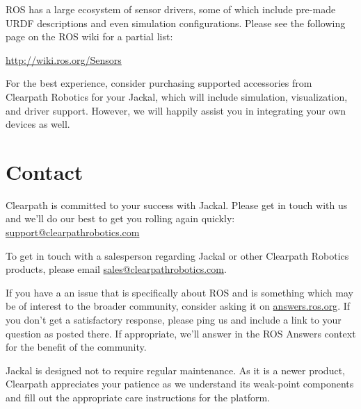 \documentclass[]{clearpath-latex/clearpath-manual}
\begin{document}
ROS has a large ecosystem of sensor drivers, some of which include pre-made URDF descriptions and
even simulation configurations. Please see the following page on the ROS wiki for a partial list:

\url{http://wiki.ros.org/Sensors}

For the best experience, consider purchasing supported accessories from Clearpath Robotics for your
Jackal, which will include simulation, visualization, and driver support. However, we will happily
assist you in integrating your own devices as well.


\section{Contact}\label{trouble}\label{contact}

Clearpath is committed to your success with Jackal. Please get in touch with us and we'll
do our best to get you rolling again quickly: \href{mailto:support@clearpathrobotics.com}{support@clearpathrobotics.com}

To get in touch with a salesperson regarding Jackal or other Clearpath Robotics products, please
email \href{mailto:sales@clearpathrobotics.com}{sales@clearpathrobotics.com}.

If you have a an issue that is specifically about ROS and is something which may be of interest
to the broader community, consider asking it on \href{http://answers.ros.org}{answers.ros.org}.
If you don't get a satisfactory response, please ping us and include a link to your question
as posted there. If appropriate, we'll answer in the ROS Answers context for the benefit of the
community.

Jackal is designed not to require regular maintenance. As it is a newer product, Clearpath
appreciates your patience as we understand its weak-point components and fill out the appropriate
care instructions for the platform.
\end{document}

